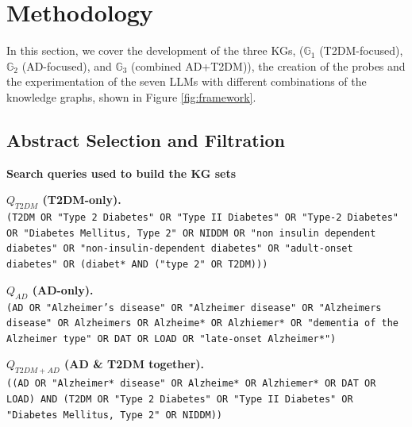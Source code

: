 \section{Methodology}
\label{sec:methodology}
In this section, we cover the development of the three KGs, (\textbf{$\mathbb{G}_1$} (T2DM-focused), \textbf{$\mathbb{G}_2$} (AD-focused), and \textbf{$\mathbb{G}_3$} (combined AD+T2DM)), the creation of the probes and the experimentation of the seven LLMs with different combinations of the knowledge graphs, shown in Figure \ref{fig:framework}. 

\subsection{Abstract Selection  and Filtration}

\begin{ashbox}
\textbf{Search queries used to build the KG sets} 

\vspace{0.4em}
\noindent\textbf{$Q_{T2DM}$ (T2DM-only).}\\
\texttt{(T2DM OR "Type 2 Diabetes" OR "Type II Diabetes" OR "Type-2 Diabetes" OR "Diabetes Mellitus, Type 2" OR NIDDM OR "non insulin dependent diabetes" OR "non-insulin-dependent diabetes" OR "adult-onset diabetes" OR (diabet* AND ("type 2" OR T2DM)))}

\vspace{0.4em}
\noindent\textbf{$Q_{AD}$ (AD-only).}\\
\texttt{(AD OR "Alzheimer's disease" OR "Alzheimer disease" OR "Alzheimers disease" OR Alzheimers OR Alzheime* OR Alzhiemer* OR "dementia of the Alzheimer type" OR DAT OR LOAD OR "late-onset Alzheimer*")}

\vspace{0.4em}
\noindent\textbf{$Q_{T2DM + AD}$ (AD \& T2DM together).}\\
\texttt{((AD OR "Alzheimer* disease" OR Alzheime* OR Alzhiemer* OR DAT OR LOAD) AND (T2DM OR "Type 2 Diabetes" OR "Type II Diabetes" OR "Diabetes Mellitus, Type 2" OR NIDDM))}

\end{ashbox}

